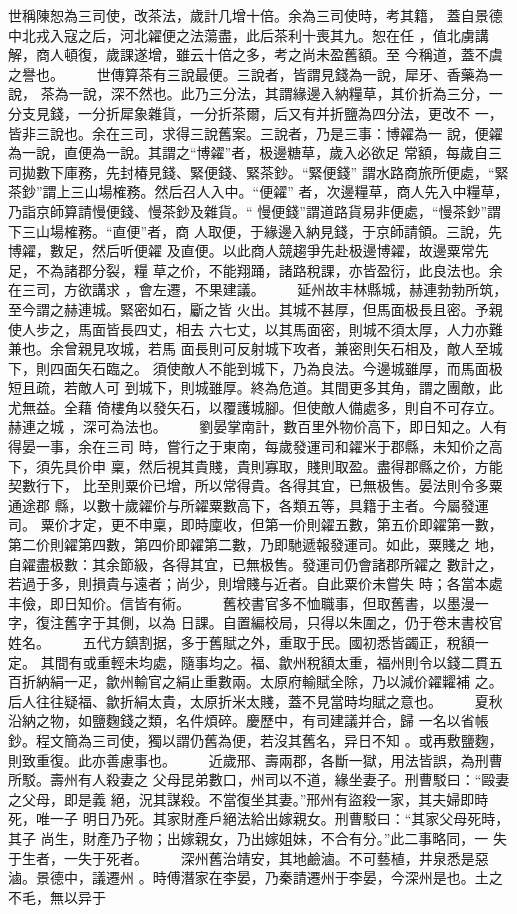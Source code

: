 \documentclass{ctexart}
\begin{document}
世稱陳恕為三司使，改茶法，歲計几增十倍。余為三司使時，考其籍， 蓋自景德中北戎入寇之后，河北糴便之法蕩盡，此后茶利十喪其九。恕在任 ，值北虜講解，商人頓復，歲課遂增，雖云十倍之多，考之尚未盈舊額。至 今稱道，蓋不虞之譽也。 　　世傳算茶有三說最便。三說者，皆謂見錢為一說，犀牙、香藥為一說， 茶為一說，深不然也。此乃三分法，其謂緣邊入納糧草，其价折為三分，一 分支見錢，一分折犀象雜貨，一分折茶爾，后又有并折鹽為四分法，更改不 一，皆非三說也。余在三司，求得三說舊案。三說者，乃是三事：博糴為一 說，便糴為一說，直便為一說。其謂之``博糴''者，极邊糖草，歲入必欲足 常額，每歲自三司拋數下庫務，先封椿見錢、緊便錢、緊茶鈔。``緊便錢'' 謂水路商旅所便處，``緊茶鈔''謂上三山場榷務。然后召人入中。``便糴'' 者，次邊糧草，商人先入中糧草，乃詣京師算請慢便錢、慢茶鈔及雜貨。`` 慢便錢''謂道路貨易非便處，``慢茶鈔''謂下三山場榷務。``直便''者，商 人取便，于緣邊入納見錢，于京師請領。三說，先博糴，數足，然后听便糴 及直便。以此商人競趨爭先赴极邊博糴，故邊粟常先足，不為諸郡分裂，糧 草之价，不能翔踊，諸路稅課，亦皆盈衍，此良法也。余在三司，方欲講求 ，會左遷，不果建議。 　　延州故丰林縣城，赫連勃勃所筑，至今謂之赫連城。緊密如石，斸之皆 火出。其城不甚厚，但馬面极長且密。予親使人步之，馬面皆長四丈，相去 六七丈，以其馬面密，則城不須太厚，人力亦難兼也。余曾親見攻城，若馬 面長則可反射城下攻者，兼密則矢石相及，敵人至城下，則四面矢石臨之。 須使敵人不能到城下，乃為良法。今邊城雖厚，而馬面极短且疏，若敵人可 到城下，則城雖厚。終為危道。其間更多其角，謂之團敵，此尤無益。全藉 倚樓角以發矢石，以覆護城腳。但使敵人備處多，則自不可存立。赫連之城 ，深可為法也。 　　劉晏掌南計，數百里外物价高下，即日知之。人有得晏一事，余在三司 時，嘗行之于東南，每歲發運司和糴米于郡縣，未知价之高下，須先具价申 稟，然后視其貴賤，貴則寡取，賤則取盈。盡得郡縣之价，方能契數行下， 比至則粟价已增，所以常得貴。各得其宜，已無极售。晏法則令多粟通途郡 縣，以數十歲糴价与所糴粟數高下，各類五等，具籍于主者。今屬發運司。 粟价才定，更不申稟，即時廩收，但第一价則糴五數，第五价即糴第一數， 第二价則糴第四數，第四价即糴第二數，乃即馳遞報發運司。如此，粟賤之 地，自糴盡极數：其余節級，各得其宜，已無极售。發運司仍會諸郡所糴之 數計之，若過于多，則損貴与遠者；尚少，則增賤与近者。自此粟价未嘗失 時；各當本處丰儉，即日知价。信皆有術。 　　舊校書官多不恤職事，但取舊書，以墨漫一字，復注舊字于其側，以為 日課。自置編校局，只得以朱圍之，仍于卷末書校官姓名。 　　五代方鎮割据，多于舊賦之外，重取于民。國初悉皆蠲正，稅額一定。 其間有或重輕未均處，隨事均之。福、歙州稅額太重，福州則令以錢二貫五 百折納絹一疋，歙州輸官之絹止重數兩。太原府輸賦全除，乃以減价糴糶補 之。后人往往疑福、歙折絹太貴，太原折米太賤，蓋不見當時均賦之意也。 　　夏秋沿納之物，如鹽麴錢之類，名件煩碎。慶歷中，有司建議并合，歸 一名以省帳鈔。程文簡為三司使，獨以謂仍舊為便，若沒其舊名，异日不知 。或再敷鹽麴，則致重復。此亦善慮事也。 　　近歲邢、壽兩郡，各斷一獄，用法皆誤，為刑曹所駁。壽州有人殺妻之 父母昆弟數口，州司以不道，緣坐妻子。刑曹駁曰：``毆妻之父母，即是義 絕，況其謀殺。不當復坐其妻。''邢州有盜殺一家，其夫婦即時死，唯一子 明日乃死。其家財產戶絕法給出嫁親女。刑曹駁曰：``其家父母死時，其子 尚生，財產乃子物；出嫁親女，乃出嫁姐妹，不合有分。''此二事略同，一 失于生者，一失于死者。 　　深州舊治靖安，其地鹼滷。不可藝植，井泉悉是惡滷。景德中，議遷州 。時傅潛家在李晏，乃秦請遷州于李晏，今深州是也。土之不毛，無以异于 
\end{document}
